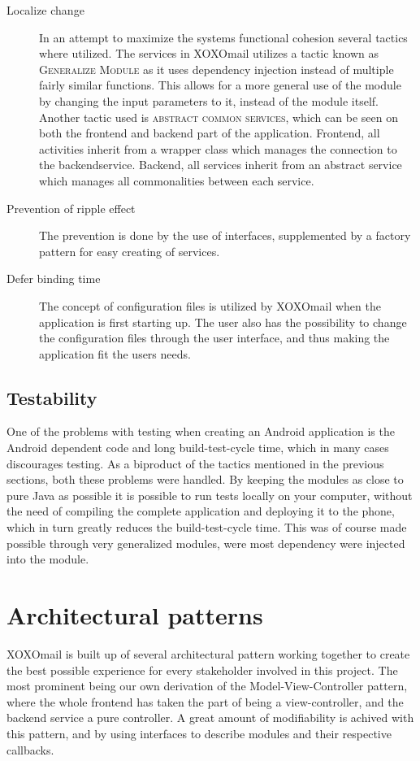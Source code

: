 			\begin{description}
				\item[Localize change] In an attempt to maximize the systems functional cohesion several tactics where utilized. The services in XOXOmail utilizes a tactic known as \textsc{Generalize Module} as it uses dependency injection instead of multiple fairly similar functions. This allows for a more general use of the module by changing the input parameters to it, instead of the module itself. Another tactic used is \textsc{abstract common services}, which can be seen on both the frontend and backend part of the application. Frontend, all activities inherit from a wrapper class which manages the connection to the backendservice. Backend, all services inherit from an abstract service which manages all commonalities between each service. 
				\item[Prevention of ripple effect] The prevention is done by the use of interfaces, supplemented by a factory pattern for easy creating of services. 
				\item[Defer binding time] The concept of configuration files is utilized by XOXOmail when the application is first starting up. The user also has the possibility to change the configuration files through the user interface, and thus making the application fit the users needs. 
			\end{description}
		
		
	\subsection{Testability}
		One of the problems with testing when creating an Android application is the Android dependent code and long build-test-cycle time, which in many cases discourages testing. As a biproduct of the tactics mentioned in the previous sections, both these problems were handled. By keeping the modules as close to pure Java as possible it is possible to run tests locally on your computer, without the need of compiling the complete application and deploying it to the phone, which in turn greatly reduces the build-test-cycle time. This was of course made possible through very generalized modules, were most dependency were injected into the module. 
		
\section{Architectural patterns}
	XOXOmail is built up of several architectural pattern working together to create the best possible experience for every stakeholder involved in this project. The most prominent being our own derivation of the Model-View-Controller pattern, where the whole frontend has taken the part of being a view-controller, and the backend service a pure controller. A great amount of modifiability is achived with this pattern, and by using interfaces to describe modules and their respective callbacks. 
	
